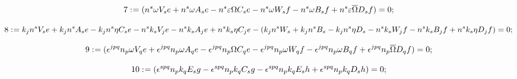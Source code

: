 \documentclass[11pt]{article}
\def\specialcolon{\mathrel{\mathop{:}}\hspace{-.5em}}
\renewcommand{\bar}[1]{\overline{#1}}
\begin{document}
\begin{dmath*}[compact, spread=2pt]
7\specialcolon{}= ({n}^{s} \omega {V}_{s} e + {n}^{s} \omega {A}_{s} e - {n}^{s} \varepsilon \Omega {C}_{s} e - {n}^{s} \omega {W}_{s} f - {n}^{s} \omega {B}_{s} f + {n}^{s} \varepsilon \bar \Omega {D}_{s} f) = 0;
\end{dmath*}

\begin{dmath*}[compact, spread=2pt]
8\specialcolon{}= {k}_{j} {n}^{s} {V}_{s} e + {k}_{j} {n}^{s} {A}_{s} e - {k}_{j} {n}^{s} \eta {C}_{s} e - {n}^{s} {k}_{s} {V}_{j} e - {n}^{s} {k}_{s} {A}_{j} e + {n}^{s} {k}_{s} \eta {C}_{j} e - ({k}_{j} {n}^{s} {W}_{s} + {k}_{j} {n}^{s} {B}_{s} - {k}_{j} {n}^{s} \eta {D}_{s} - {n}^{s} {k}_{s} {W}_{j} f - {n}^{s} {k}_{s} {B}_{j} f + {n}^{s} {k}_{s} \eta {D}_{j} f) = 0;
\end{dmath*}

\begin{dmath*}[compact, spread=2pt]
9\specialcolon{}= ({\epsilon}^{j p q} {n}_{p} \omega {V}_{q} e + {\epsilon}^{j p q} {n}_{p} \omega {A}_{q} e - {\epsilon}^{j p q} {n}_{p} \Omega {C}_{q} e - {\epsilon}^{j p q} {n}_{p} \omega {W}_{q} f - {\epsilon}^{j p q} {n}_{p} \omega {B}_{q} f + {\epsilon}^{j p q} {n}_{p} \bar \Omega {D}_{q} f) = 0;
\end{dmath*}

\begin{dmath*}[compact, spread=2pt]
10\specialcolon{}= ({\epsilon}^{s p q} {n}_{p} {k}_{q} {E}_{s} g - {\epsilon}^{s p q} {n}_{p} {k}_{q} {C}_{s} g - {\epsilon}^{s p q} {n}_{p} {k}_{q} {E}_{s} h + {\epsilon}^{s p q} {n}_{p} {k}_{q} {D}_{s} h) = 0;
\end{dmath*}
\end{document}
